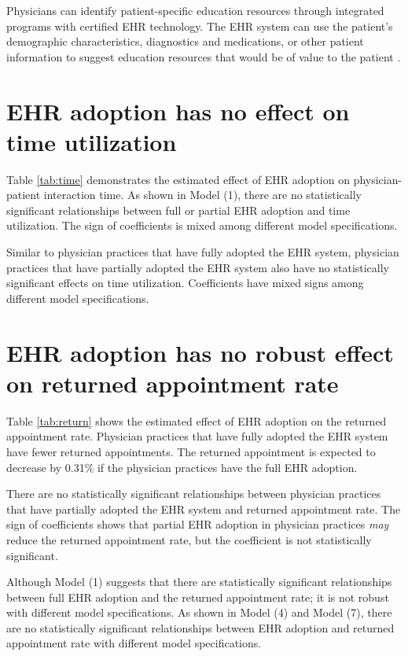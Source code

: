 \documentclass[12pt]{report}
\begin{document}
Physicians can identify patient-specific education resources through integrated programs with certified EHR technology. The EHR system can use the patient's demographic characteristics, diagnostics and medications, or other patient information to suggest education resources that would be of value to the patient \citep{hitrc_edu}. 

\section{EHR adoption has no effect on time utilization}
Table \ref{tab:time} demonstrates the estimated effect of EHR adoption on physician-patient interaction time. As shown in Model (1), there are no statistically significant relationships between full or partial EHR adoption and time utilization. The sign of coefficients is mixed among different model specifications.

Similar to physician practices that have fully adopted the EHR system, physician practices that have partially adopted the EHR system also have no statistically significant effects on time utilization. Coefficients have mixed signs among different model specifications.



\section{EHR adoption has no robust effect on returned appointment rate}

Table \ref{tab:return} shows the estimated effect of EHR adoption on the returned appointment rate. Physician practices that have fully adopted the EHR system have fewer returned appointments. The returned appointment is expected to decrease by 0.31\% if the physician practices have the full EHR adoption. 

There are no statistically significant relationships between physician practices that have partially adopted the EHR system and returned appointment rate. The sign of coefficients shows that partial EHR adoption in physician practices \textit{may} reduce the returned appointment rate, but the coefficient is not statistically significant.

Although Model (1) suggests that there are statistically significant relationships between full EHR adoption and the returned appointment rate; it is not robust with different model specifications.  As shown in Model (4) and Model (7), there are no statistically significant relationships between EHR adoption and returned appointment rate with different model specifications.
\end{document}
